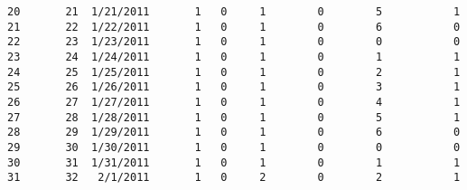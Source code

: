 \documentclass[11pt]{article}
\begin{document}
\begin{tcolorbox}[breakable, size=fbox, boxrule=.5pt, pad at break*=1mm, opacityfill=0]
\begin{Verbatim}[commandchars=\\\{\}]
20       21  1/21/2011       1   0     1        0        5           1
21       22  1/22/2011       1   0     1        0        6           0
22       23  1/23/2011       1   0     1        0        0           0
23       24  1/24/2011       1   0     1        0        1           1
24       25  1/25/2011       1   0     1        0        2           1
25       26  1/26/2011       1   0     1        0        3           1
26       27  1/27/2011       1   0     1        0        4           1
27       28  1/28/2011       1   0     1        0        5           1
28       29  1/29/2011       1   0     1        0        6           0
29       30  1/30/2011       1   0     1        0        0           0
30       31  1/31/2011       1   0     1        0        1           1
31       32   2/1/2011       1   0     2        0        2           1


\end{Verbatim}
\end{tcolorbox}
\end{document}
